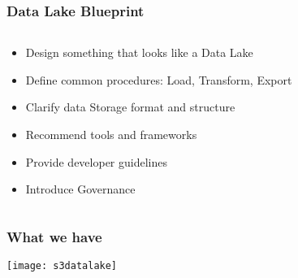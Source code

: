 \documentclass[aspectratio=169, 15pt,usenames,dvipsnames]{beamer}
\begin{document}
\begin{frame}
  \frametitle{Data Lake Blueprint}
  \centering\LARGE
  \begin{columns}
	\begin{column}{0.9\textwidth}
	  \begin{itemize}
    \item Design something that looks like a Data Lake
		\item Define common procedures: Load, Transform, Export
		\item Clarify data Storage format and structure
	\pause
		\item Recommend tools and frameworks
		\item Provide developer guidelines
		\item Introduce Governance
	  \end{itemize}
	\end{column}
  \end{columns}
\end{frame}
\begin{frame}
  \frametitle{What we have}
		\centering\texttt{[image: s3datalake]} \\
\end{frame}
\end{document}
